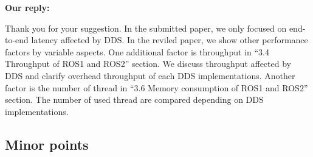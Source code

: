 \documentclass{article}
\begin{document}
\begin{enumerate}
  \begin{flushleft}
    \textbf{Our reply:}
  \end{flushleft}
  Thank you for your suggestion.
  In the submitted paper, we only focused on end-to-end latency affected by DDS.
  In the reviled paper, we show other performance factors by variable aspects.
  One additional factor is throughput in ``3.4 Throughput of ROS1 and ROS2'' section.
  We discuss throughput affected by DDS and clarify overhead throughput of each DDS implementations.
  Another factor is the number of thread in ``3.6 Memory consumption of ROS1 and ROS2'' section.
  The number of used thread are compared depending on DDS implementations.
  
\end{enumerate}

\subsection{Minor points}
\end{document}
